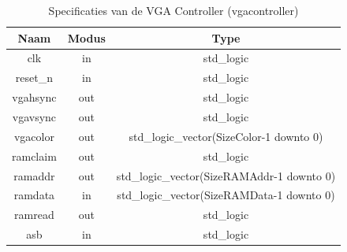 \documentclass{scrreprt} %
\begin{document}
\begin{table}[H]
\centering
\caption{Specificaties van de VGA Controller (vgacontroller)}
\label{tab:spec-vgacontroller}
\begin{tabular}{c c c}
	\hline\hline
 	Naam & Modus & Type\\
 	\hline	
	clk & in & std\_logic \\ 
	reset\_n & in & std\_logic \\ 
	vgahsync & out & std\_logic \\ 
	vgavsync & out & std\_logic \\ 
	vgacolor & out & std\_logic\_vector(SizeColor-1 downto 0) \\
	ramclaim & out & std\_logic \\ 
	ramaddr & out & std\_logic\_vector(SizeRAMAddr-1 downto 0) \\
	ramdata & in & std\_logic\_vector(SizeRAMData-1 downto 0) \\ 
	ramread & out & std\_logic \\
	asb & in & std\_logic \\
  	\hline
\end{tabular}
\end{table}
\end{document}
